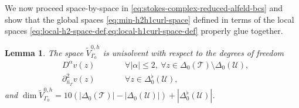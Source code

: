 \documentclass{mcom-l}
\newtheorem{lemma}[theorem]{Lemma}
\theoremstyle{definition}
\theoremstyle{remark}
\numberwithin{equation}{section}
\newcommand{\unitvec}[1]{\hat{#1}}
\newcommand{\mesh}[0]{\mathcal{T}}
\newcommand{\boundarymesh}[0]{\mathcal{U}}
\begin{document}
We now proceed space-by-space in \cref{eq:stokes-complex-reduced-alfeld-bcs}
and show that the global spaces \cref{eq:min-h2h1curl-space} defined in terms
of the local spaces 
\cref{eq:local-h2-space-def,eq:local-h1curl-space-def}
properly glue together.

\begin{lemma}
	\label{lem:min-h2-space-dofs-bcs}
	The space $\tilde{V}^{0, h}_{\Gamma_0}$ is unisolvent 
	with respect to the degrees of freedom 
	\begin{subequations}
		\label{eq:min-h2-space-dofs-bcs}
		\begin{alignat}{2}
			&D^{\alpha} v(z) \qquad 
			& &\forall |\alpha| \leq 2, \ \forall z \in \Delta_0(\mesh) 
			\setminus \Delta_0(\boundarymesh), \\
			&\partial_{\unitvec{n}_{\Gamma}}^2 v(z) \qquad 
			& &\forall z \in \Delta_0^{\flat}(\boundarymesh),
		\end{alignat}
	\end{subequations}
	and $\dim \tilde{V}^{0, h}_{\Gamma_0} = 
	10(|\Delta_0(\mesh)| - |\Delta_0(\boundarymesh)|)
	+ |\Delta_0^{\flat}(\boundarymesh)|$.
\end{lemma}
\end{document}
